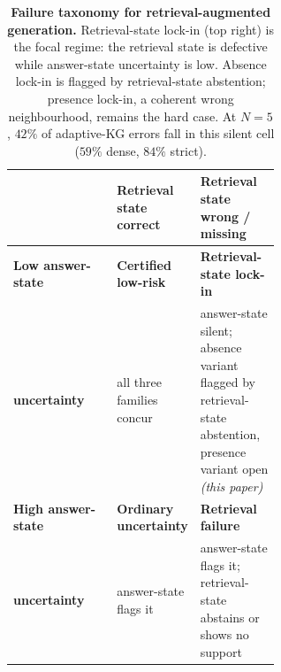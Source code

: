 \begin{table}[t]
\centering
\small
\setlength{\tabcolsep}{6pt}
\renewcommand{\arraystretch}{1.25}
\caption{%
  \textbf{Failure taxonomy for retrieval-augmented generation.}
  Retrieval-state lock-in (top right) is the focal regime: the retrieval state
  is defective while answer-state uncertainty is low.
  Absence lock-in is flagged by retrieval-state abstention; presence lock-in,
  a coherent wrong neighbourhood, remains the hard case.
  At $N{=}5$, $42\%$ of adaptive-KG errors fall in this silent cell
  ($59\%$ dense, $84\%$ strict).%
}
\label{tab:failure_taxonomy}
\begin{tabular}{@{}l >{\raggedright\arraybackslash}p{0.30\linewidth}
                     >{\raggedright\arraybackslash}p{0.30\linewidth}@{}}
\toprule
& \textbf{Retrieval state correct}
& \textbf{Retrieval state wrong / missing} \\
\midrule
\textbf{Low answer-state}  & \cellcolor{goodgreen!15}\textbf{Certified low-risk}
                           & \cellcolor{badred!15}\textbf{Retrieval-state lock-in} \\
\textbf{uncertainty}       & \cellcolor{goodgreen!15}all three families concur
                           & \cellcolor{badred!15}answer-state silent; absence variant flagged by retrieval-state abstention, presence variant open \emph{(this paper)} \\
\addlinespace[0.3em]
\textbf{High answer-state} & \cellcolor{yellow!12}\textbf{Ordinary uncertainty}
                           & \cellcolor{black!6}\textbf{Retrieval failure} \\
\textbf{uncertainty}       & \cellcolor{yellow!12}answer-state flags it
                           & \cellcolor{black!6}answer-state flags it; retrieval-state abstains or shows no support \\
\bottomrule
\end{tabular}
\end{table}
